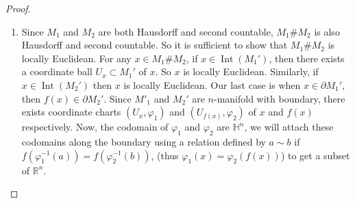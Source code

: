 \documentclass[12pt, a4paper]{article}
\theoremstyle{plain}
\newcommand{\Hs}{\mathbb{H}}
\newcommand{\R}{\mathbb{R}}
\def\phi{\varphi}
\DeclareMathOperator{\inter}{Int}
\begin{document}
    \begin{proof}
    \hfill
        \begin{enumerate}[label=(\alph*)]
            \item Since $M_1$ and $M_2$ are both Hausdorff and second countable, $M_1 \# M_2$ is also Hausdorff and second countable. So it is sufficient to show that $M_1\#M_2$ is locally Euclidean. For any $x\in M_1 \# M_2$, if $x\in \inter(M_1')$, then there exists a coordinate ball $U_x\subset M_1'$ of $x$. So $x$ is locally Euclidean. Similarly, if $x\in \inter(M_2')$ then $x$ is locally Euclidean. Our last case is when $x\in \partial M_1'$, then $f(x)\in \partial M_2'$. Since $M'_1$ and $M_2'$ are $n$-manifold with boundary, there exists coordinate charts $(U_x,\phi_1)$ and $(U_{f(x)},\phi_2)$ of $x$ and $f(x)$ respectively. 
            Now, the codomain of $\phi_1$ and $\phi_2$ are $\Hs^n$, we will attach these codomains along the boundary using a relation defined by $a\sim b$ if $f(\phi_1^{-1}(a))=f(\phi_2^{-1}(b))$, (thus $\phi_1(x)=\phi_2(f(x))$) to get a subset of $\R^n$. 
            

\end{enumerate}
\end{proof}
\end{document}
